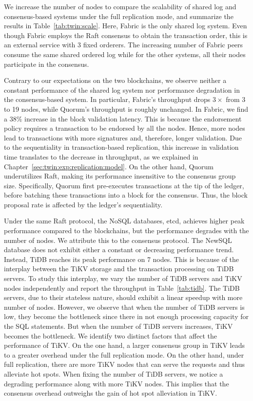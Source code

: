 We increase the number of nodes to compare the scalability of shared log and
consensus-based systems under the full replication mode, and summarize the
results in Table~\ref{tab:twin:scale}.
Here, Fabric is the only shared log system.
Even though Fabric employs the Raft consensus to obtain the transaction order,
this is an external service with 3 fixed orderers. 
The increasing number of Fabric peers consume the same shared ordered log while for the other systems, all their nodes participate in the consensus.

Contrary to our expectations on the two blockchains, we observe neither a constant performance of the
shared log system nor performance degradation in the consensus-based system.
In particular, Fabric's throughput drops $3\times$ from 3 to 19 nodes, while
Quorum's throughput is roughly unchanged.
In Fabric, we find a $38\%$ increase in the block validation latency.
This is because the endorsement policy requires a transaction to be endorsed by
all the nodes.
Hence, more nodes lead to transactions with more signatures and, therefore,
longer validation.
Due to the sequentiality in transaction-based replication, this increase in
validation time translates to the decrease in throughput, as we explained in
Chapter~\ref{sec:twin:exp:replication:model}.
On the other hand, Quorum underutilizes Raft, making its performance insensitive
to the consensus group size.
Specifically, Quorum first pre-executes transactions at the tip of the ledger,
before batching these transactions into a block for the consensus.
Thus, the block proposal rate is affected by the ledger's sequentiality.

Under the same Raft protocol, the NoSQL databases, etcd, achieves
higher peak performance compared to the blockchains, but the performance
degrades with the number of nodes.
We attribute this to the consensus protocol.
The NewSQL database does not exhibit either a constant or decreasing performance
trend.
Instead, TiDB reaches its peak performance on 7 nodes.
This is because of the interplay between the TiKV storage and the
transaction processing on TiDB servers.
To study this interplay, we vary the number of TiDB servers and TiKV nodes independently and report the throughput in Table~\ref{tab:tidb}.
The TiDB servers, due to their stateless nature, should exhibit a linear speedup with more number of nodes. 
However, we observe that when the number of TiDB servers is low, they become the bottleneck since there in not enough processing capacity for the SQL statements. 
But when the number of TiDB servers increases, TiKV becomes the bottleneck.
We identify two distinct factors that affect the performance of TiKV.
On the one hand, a larger consensus group in TiKV leads to a greater overhead under the full replication mode. 
On the other hand, under full replication, there are more TiKV nodes that can serve the requests and thus alleviate hot spots.
When fixing the number of TiDB servers, we notice a degrading performance along with more TiKV nodes.
This implies that the consensus overhead outweighs the gain of hot spot alleviation in TiKV.

